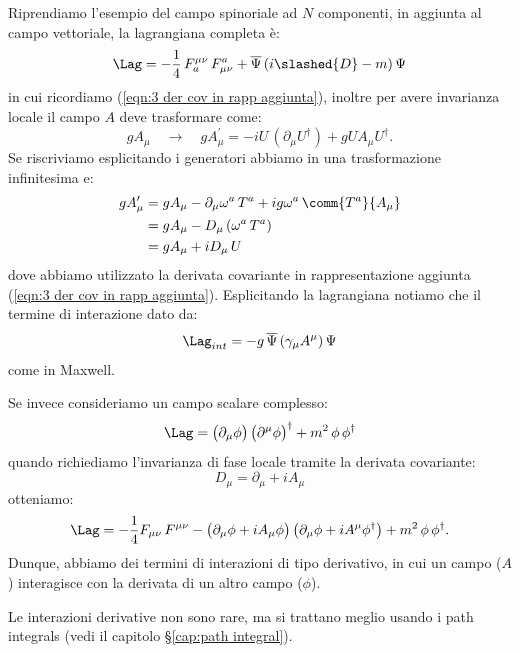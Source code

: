 Riprendiamo l'esempio del campo spinoriale ad $N$ componenti, in aggiunta al campo vettoriale, la lagrangiana completa è:
\begin{equation}
    \Lag = -\frac{1}{4}\, F_a^{\mu\nu}\, F_{\mu\nu}^a + \overline{\Psi}\, (i\slashed{D} - m)\, \Psi
\end{equation}
in cui ricordiamo (\ref{eqn:3 der cov in rapp aggiunta}), inoltre per avere invarianza locale il campo $A$ deve trasformare come:
\begin{equation}
    gA_\mu \quad \longrightarrow\quad gA_\mu^\prime = -iU\, (\partial_\mu U^\dagger) + gUA_\mu U^\dagger.
\end{equation}
Se riscriviamo esplicitando i generatori abbiamo in una trasformazione infinitesima e:
\begin{align}
    gA_\mu^\prime &= gA_\mu - \partial_\mu\omega^a\, T^a + ig\omega^a\, \comm{T^a}{A_\mu} \\
    &= gA_\mu - D_\mu\, (\omega^a\, T^a) \\
    &= gA_\mu + iD_\mu\, U
\end{align}
dove abbiamo utilizzato la derivata covariante in rappresentazione aggiunta (\ref{eqn:3 der cov in rapp aggiunta}). Esplicitando la lagrangiana notiamo che il termine di interazione dato da:
\begin{equation}
    \Lag_{int} = -g\, \overline{\Psi}\, (\gamma_\mu A^\mu)\, \Psi
\end{equation}
come in Maxwell.

Se invece consideriamo un campo scalare complesso:
\begin{equation}
    \Lag = \big( \partial_\mu\phi \big)\, \big( \partial^\mu\phi \big)^\dagger + m^2\, \phi\, \phi^\dagger
\end{equation}
quando richiediamo l'invarianza di fase locale tramite la derivata covariante:
\begin{equation}
    D_\mu = \partial_\mu + iA_\mu
\end{equation}
otteniamo:
\begin{equation}
    \Lag = -\frac{1}{4}F_{\mu\nu}\, F^{\mu\nu} - \big( \partial_\mu\phi + iA_\mu\phi \big)\, \big( \partial_\mu\phi + iA^\mu\phi^\dagger \big) + m^2\, \phi\, \phi^\dagger.
\end{equation}
Dunque, abbiamo dei termini di interazioni di tipo derivativo, in cui un campo ($A$) interagisce con la derivata di un altro campo ($\phi$).

Le interazioni derivative non sono rare, ma si trattano meglio usando i path integrals (vedi il capitolo \S\ref{cap:path integral}).